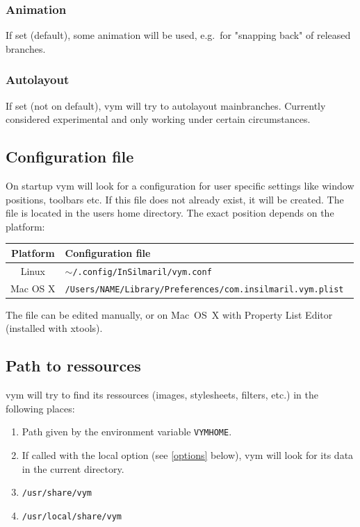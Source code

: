 \documentclass[12pt,a4paper]{article}
\newcommand{\vym}{{\sc vym }}
\begin{document}
\begin{appendix}
\subsubsection*{Animation}
    If set (default), some animation will be used, e.g.\ for "snapping
    back" of released branches.

\subsubsection*{Autolayout} %
    If set (not on default), \vym will try to autolayout mainbranches.
    Currently considered experimental and only working under certain
    circumstances. 

\subsection{Configuration file}
On startup \vym will look for a configuration for user specific settings
like window positions, toolbars etc. If this file does not already
exist, it will be created. The file is located in the users home
directory. The exact position depends on the platform:
\begin{center}
\begin{tabular}{cl}
    {\bf Platform}  & {\bf Configuration file} \\ \hline
    Linux       & {\tt $\sim$/.config/InSilmaril/vym.conf  } \\
    Mac OS X    & {\tt /Users/NAME/Library/Preferences/com.insilmaril.vym.plist  } \\
\end{tabular}
\end{center}
The file can be edited manually, or on Mac~OS~X with Property List
Editor (installed with xtools).

\subsection{Path to ressources}
\vym will try to find its ressources (images, stylesheets, filters,
etc.) in the following places:
\begin{enumerate}
    \item Path given by the environment variable {\tt VYMHOME}.
    \item If called with the local option (see \ref{options} below),
          \vym will look for its data in the current directory.
    \item {\tt /usr/share/vym}
    \item {\tt /usr/local/share/vym}
\end{enumerate}


\end{appendix}
\end{document}
